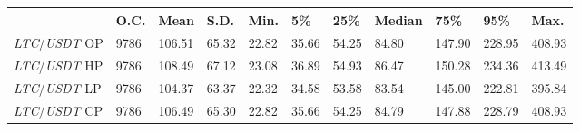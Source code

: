 \begin{tabular}{lllllllllll}
\toprule
 & \textbf{O.C.} & \textbf{Mean} & \textbf{S.D.} & \textbf{Min.} & \textbf{5\%} & \textbf{25\%} & \textbf{Median} & \textbf{75\%} & \textbf{95\%} & \textbf{Max.} \\
\midrule
\emph{LTC}/\emph{USDT} OP & 9786 & 106.51 & 65.32 & 22.82 & 35.66 & 54.25 & 84.80 & 147.90 & 228.95 & 408.93 \\
\emph{LTC}/\emph{USDT} HP & 9786 & 108.49 & 67.12 & 23.08 & 36.89 & 54.93 & 86.47 & 150.28 & 234.36 & 413.49 \\
\emph{LTC}/\emph{USDT} LP & 9786 & 104.37 & 63.37 & 22.32 & 34.58 & 53.58 & 83.54 & 145.00 & 222.81 & 395.84 \\
\emph{LTC}/\emph{USDT} CP & 9786 & 106.49 & 65.30 & 22.82 & 35.66 & 54.25 & 84.79 & 147.88 & 228.79 & 408.93 \\
\bottomrule
\end{tabular}
